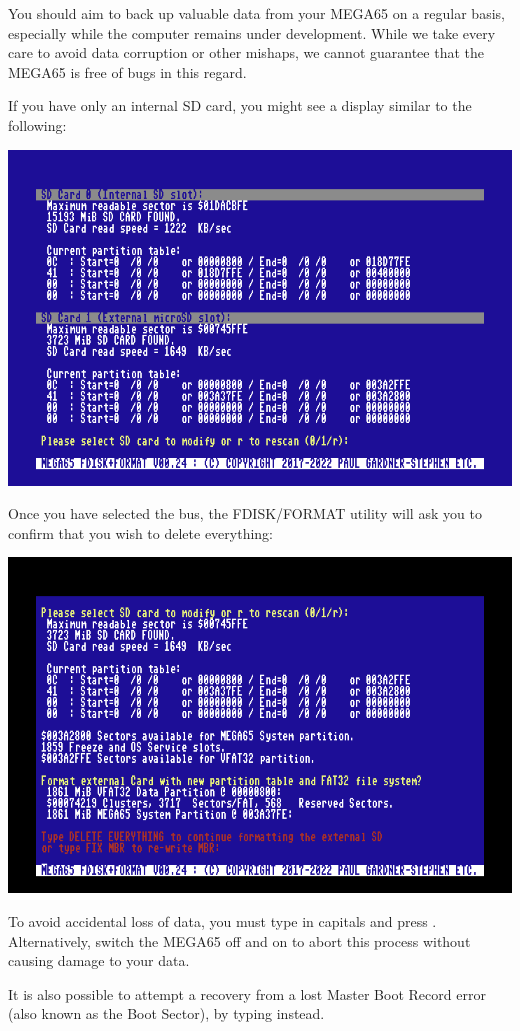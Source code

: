 You should aim to back up valuable data from your
MEGA65 on a regular basis, especially while the computer remains under
development.  While we take every care to avoid data corruption or
other mishaps, we cannot guarantee that the MEGA65 is free of bugs in
this regard.

If you have only an internal SD card, you might see a
display similar to the following:

\begin{center}
\includegraphics[trim= 10mm  7mm 10mm 10mm,clip,width=0.7\linewidth]{images/ss-m65fdisk-busselect.png}
\end{center}

Once you have selected the bus, the FDISK/FORMAT utility will ask you to confirm that you wish to delete everything:

\begin{center}
\includegraphics[trim= 10mm  7mm 10mm 15mm,clip,width=0.7\linewidth]{images/ss-m65fdisk-typesomething.png}
\end{center}

To avoid accidental loss of data, you must type  in capitals and press . Alternatively, switch the MEGA65 off and on to abort this process without causing damage to your data.

It is also possible to attempt a recovery from a lost Master Boot Record error (also known as the Boot Sector), by typing  instead.

